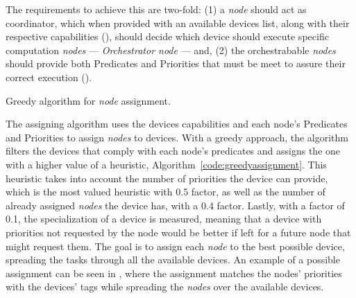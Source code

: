 The requirements to achieve this are two-fold: (1) a \textit{node} should act as coordinator, which when provided with an available devices list, along with their respective capabilities (\cf {}), should decide which device should execute specific computation \textit{nodes} --- \textit{Orchestrator node} --- and, (2) the orchestrabable \textit{nodes} should provide both Predicates and Priorities that must be meet to assure their correct execution (\cf {}).

\begin{algorithm}
\BlankLine
{}
\BlankLine
{}
\caption{Greedy algorithm for \textit{node} assignment.}
\label{code:greedyassignment}
\end{algorithm}

The assigning algorithm uses the devices capabilities and each node's Predicates and Priorities to assign \textit{nodes} to devices. With a greedy approach, the algorithm filters the devices that comply with each node's predicates and assigns the one with a higher value of a heuristic, \cf Algorithm~\ref{code:greedyassignment}. This heuristic takes into account the number of priorities the device can provide, which is the most valued heuristic with 0.5 factor, as well as the number of already assigned \textit{nodes} the device has, with a 0.4 factor. Lastly, with a factor of 0.1, the specialization of a device is measured, meaning that a device with priorities not requested by the node would be better if left for a future node that might request them. The goal is to assign each \textit{node} to the best possible device, spreading the tasks through all the available devices. An example of a possible assignment can be seen in , where the assignment matches the nodes' priorities with the devices' tags while spreading the \textit{nodes} over the available devices.

